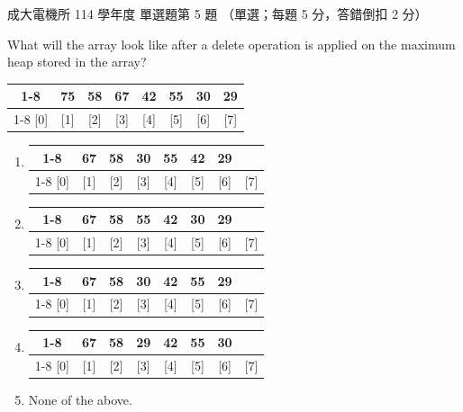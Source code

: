 \begin{pastexam}[label={px:ncku-114-ee-ds-05}]{成大電機所 114 學年度 單選題第 5 題}
（單選；每題 5 分，答錯倒扣 2 分）

What will the array look like after a delete operation is applied on the maximum heap stored in
the array?

\begin{center}
\begin{tabular}{*{8}{c}}
\cline{1-8}
\multicolumn{1}{|c|}{-} & \multicolumn{1}{c|}{75} & \multicolumn{1}{c|}{58} & \multicolumn{1}{c|}{67} & \multicolumn{1}{c|}{42} & \multicolumn{1}{c|}{55} & \multicolumn{1}{c|}{30} & \multicolumn{1}{c|}{29}\\
\cline{1-8}
[0] & [1] & [2] & [3] & [4] & [5] & [6] & [7]
\end{tabular}
\end{center}
\begin{enumerate}[label=\alph*)]
\item \begin{tabular}[t]{*{8}{c}}
\cline{1-8}
\multicolumn{1}{|c|}{-} & \multicolumn{1}{c|}{67} & \multicolumn{1}{c|}{58} & \multicolumn{1}{c|}{30} & \multicolumn{1}{c|}{55} & \multicolumn{1}{c|}{42} & \multicolumn{1}{c|}{29} & \multicolumn{1}{c|}{ }\\
\cline{1-8}
[0] & [1] & [2] & [3] & [4] & [5] & [6] & [7]
\end{tabular}
\item \begin{tabular}[t]{*{8}{c}}
\cline{1-8}
\multicolumn{1}{|c|}{-} & \multicolumn{1}{c|}{67} & \multicolumn{1}{c|}{58} & \multicolumn{1}{c|}{55} & \multicolumn{1}{c|}{42} & \multicolumn{1}{c|}{30} & \multicolumn{1}{c|}{29} & \multicolumn{1}{c|}{ }\\
\cline{1-8}
[0] & [1] & [2] & [3] & [4] & [5] & [6] & [7]
\end{tabular}
\item \begin{tabular}[t]{*{8}{c}}
\cline{1-8}
\multicolumn{1}{|c|}{-} & \multicolumn{1}{c|}{67} & \multicolumn{1}{c|}{58} & \multicolumn{1}{c|}{30} & \multicolumn{1}{c|}{42} & \multicolumn{1}{c|}{55} & \multicolumn{1}{c|}{29} & \multicolumn{1}{c|}{ }\\
\cline{1-8}
[0] & [1] & [2] & [3] & [4] & [5] & [6] & [7]
\end{tabular}
\item \begin{tabular}[t]{*{8}{c}}
\cline{1-8}
\multicolumn{1}{|c|}{-} & \multicolumn{1}{c|}{67} & \multicolumn{1}{c|}{58} & \multicolumn{1}{c|}{29} & \multicolumn{1}{c|}{42} & \multicolumn{1}{c|}{55} & \multicolumn{1}{c|}{30} & \multicolumn{1}{c|}{ }\\
\cline{1-8}
[0] & [1] & [2] & [3] & [4] & [5] & [6] & [7]
\end{tabular}
\item None of the above.
\end{enumerate}
\end{pastexam}


